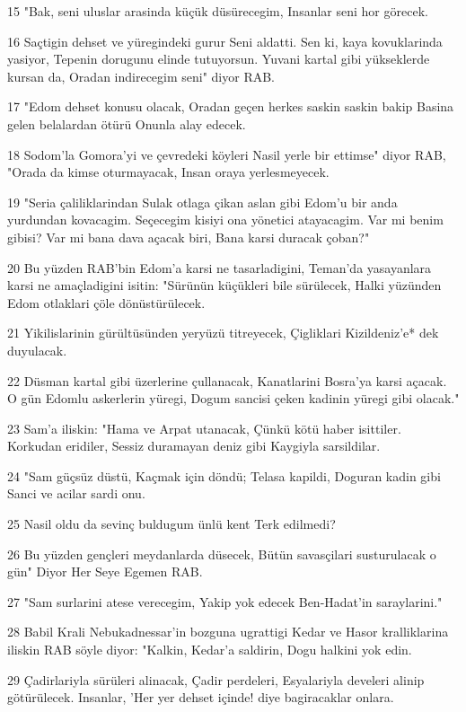 \par 15 "Bak, seni uluslar arasinda küçük düsürecegim, Insanlar seni hor görecek.
\par 16 Saçtigin dehset ve yüregindeki gurur Seni aldatti. Sen ki, kaya kovuklarinda yasiyor, Tepenin dorugunu elinde tutuyorsun. Yuvani kartal gibi yükseklerde kursan da, Oradan indirecegim seni" diyor RAB.
\par 17 "Edom dehset konusu olacak, Oradan geçen herkes saskin saskin bakip Basina gelen belalardan ötürü Onunla alay edecek.
\par 18 Sodom'la Gomora'yi ve çevredeki köyleri Nasil yerle bir ettimse" diyor RAB, "Orada da kimse oturmayacak, Insan oraya yerlesmeyecek.
\par 19 "Seria çaliliklarindan Sulak otlaga çikan aslan gibi Edom'u bir anda yurdundan kovacagim. Seçecegim kisiyi ona yönetici atayacagim. Var mi benim gibisi? Var mi bana dava açacak biri, Bana karsi duracak çoban?"
\par 20 Bu yüzden RAB'bin Edom'a karsi ne tasarladigini, Teman'da yasayanlara karsi ne amaçladigini isitin: "Sürünün küçükleri bile sürülecek, Halki yüzünden Edom otlaklari çöle dönüstürülecek.
\par 21 Yikilislarinin gürültüsünden yeryüzü titreyecek, Çigliklari Kizildeniz'e* dek duyulacak.
\par 22 Düsman kartal gibi üzerlerine çullanacak, Kanatlarini Bosra'ya karsi açacak. O gün Edomlu askerlerin yüregi, Dogum sancisi çeken kadinin yüregi gibi olacak."
\par 23 Sam'a iliskin: "Hama ve Arpat utanacak, Çünkü kötü haber isittiler. Korkudan eridiler, Sessiz duramayan deniz gibi Kaygiyla sarsildilar.
\par 24 "Sam güçsüz düstü, Kaçmak için döndü; Telasa kapildi, Doguran kadin gibi Sanci ve acilar sardi onu.
\par 25 Nasil oldu da sevinç buldugum ünlü kent Terk edilmedi?
\par 26 Bu yüzden gençleri meydanlarda düsecek, Bütün savasçilari susturulacak o gün" Diyor Her Seye Egemen RAB.
\par 27 "Sam surlarini atese verecegim, Yakip yok edecek Ben-Hadat'in saraylarini."
\par 28 Babil Krali Nebukadnessar'in bozguna ugrattigi Kedar ve Hasor kralliklarina iliskin RAB söyle diyor: "Kalkin, Kedar'a saldirin, Dogu halkini yok edin.
\par 29 Çadirlariyla sürüleri alinacak, Çadir perdeleri, Esyalariyla develeri alinip götürülecek. Insanlar, 'Her yer dehset içinde! diye bagiracaklar onlara.
